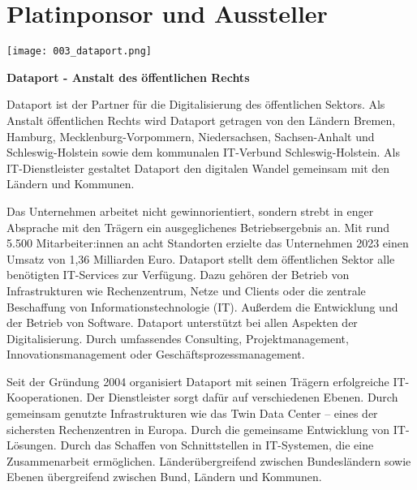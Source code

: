 \section*{Platinponsor und Aussteller}
  \texttt{[image: 003\_dataport.png]}
  \vspace{1.0\baselineskip}
  
\noindent
    {\bfseries Dataport - Anstalt des öffentlichen Rechts}
    \vspace{1.0\baselineskip}
    
\noindent
Dataport ist der Partner für die Digitalisierung des öffentlichen Sektors. Als Anstalt öffentlichen Rechts wird Dataport getragen von den Ländern Bremen, Hamburg, Mecklenburg-Vorpommern, Niedersachsen, Sachsen-Anhalt und Schleswig-Holstein sowie dem kommunalen IT-Verbund Schleswig-Holstein. Als IT-Dienstleister gestaltet Dataport den digitalen Wandel gemeinsam mit den Ländern und Kommunen.

\noindent
Das Unternehmen arbeitet nicht gewinnorientiert, sondern strebt in enger Absprache mit den Trägern ein ausgeglichenes Betriebsergebnis an. Mit rund 5.500 Mitarbeiter:innen an acht Standorten erzielte das Unternehmen 2023 einen Umsatz von 1,36 Milliarden Euro. Dataport stellt dem öffentlichen Sektor alle benötigten IT-Services zur Verfügung. Dazu gehören der Betrieb von Infrastrukturen wie Rechenzentrum, Netze und Clients oder die zentrale Beschaffung von Informationstechnologie (IT). Außerdem die Entwicklung und der Betrieb von Software. Dataport unterstützt bei allen Aspekten der Digitalisierung. Durch umfassendes Consulting, Projektmanagement, Innovationsmanagement oder Geschäftsprozessmanagement.

\noindent
Seit der Gründung 2004 organisiert Dataport mit seinen Trägern erfolgreiche IT-Kooperationen. Der Dienstleister sorgt dafür auf verschiedenen Ebenen. Durch gemeinsam genutzte Infrastrukturen wie das Twin Data Center – eines der sichersten Rechenzentren in Europa. Durch die gemeinsame Entwicklung von IT-Lösungen. Durch das Schaffen von Schnittstellen in IT-Systemen, die eine Zusammenarbeit ermöglichen. Länderübergreifend zwischen Bundesländern sowie Ebenen übergreifend zwischen Bund, Ländern und Kommunen.

